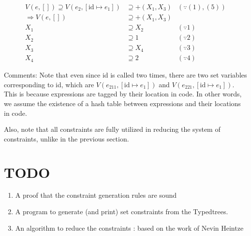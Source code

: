 \documentclass{article}
\begin{document}
\begin{align*}
  V(e,[])\supseteq V(e_{2},[\text{id}\mapsto e_{1}])
  &\supseteq +(X_{1},X_{3}) & (\because (1),(5))\\
  \Rightarrow V(e,[])&\supseteq +(X_{1},X_{3}) &\\
  X_{1}&\supseteq X_{2}&(\because 1)\\
  X_{2}&\supseteq 1&(\because 2)\\
  X_{3}&\supseteq X_{4}&(\because 3)\\
  X_{4}&\supseteq 2&(\because 4)
\end{align*}

Comments: Note that even since id is called two times, there are two set variables corresponding to id, which are $V(e_{211},[\text{id}\mapsto e_{1}])$ and $V(e_{221},[\text{id}\mapsto e_{1}])$.
This is because expressions are tagged by their location in code.
In other words, we assume the existence of a hash table between expressions and their locations in code.

Also, note that all constraints are fully utilized in reducing the system of constraints, unlike in the previous section.

\section{TODO}
\begin{enumerate}
  \item A proof that the constraint generation rules are sound
  \item A program to generate (and print) set constraints from the Typedtrees.
  \item An algorithm to reduce the constraints : based on the work of Nevin Heintze\cite{Hei91}
\end{enumerate}
\printbibliography
\end{document}
